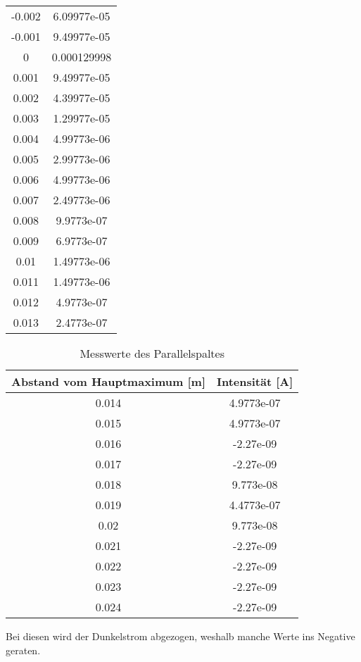 \begin{table}[H]
\begin{tabular}{c c}
 -0.002       &  6.09977e-05 \\
 -0.001       &  9.49977e-05 \\
  0           &  0.000129998 \\
  0.001       &  9.49977e-05 \\
  0.002       &  4.39977e-05 \\
  0.003       &  1.29977e-05 \\
  0.004       &  4.99773e-06 \\
  0.005       &  2.99773e-06 \\
  0.006       &  4.99773e-06 \\
  0.007       &  2.49773e-06 \\
  0.008       &  9.9773e-07  \\
  0.009       &  6.9773e-07  \\
  0.01        &  1.49773e-06 \\
  0.011       &  1.49773e-06 \\
  0.012       &  4.9773e-07  \\
  0.013       &  2.4773e-07  \\
  \bottomrule
  \end{tabular}
  \end{table}
  \begin{table}[H]
    \centering
    \caption{Messwerte des Parallelspaltes}
    \label{tab:mag}
    \begin{tabular}{c c}
     \toprule
      Abstand vom Hauptmaximum [m] & Intensität [A]\\
     \midrule
  0.014       &  4.9773e-07  \\
  0.015       &  4.9773e-07  \\
  0.016       & -2.27e-09    \\
  0.017       & -2.27e-09    \\
  0.018       &  9.773e-08   \\
  0.019       &  4.4773e-07  \\
  0.02        &  9.773e-08   \\
  0.021       & -2.27e-09    \\
  0.022       & -2.27e-09    \\
  0.023       & -2.27e-09    \\
  0.024       & -2.27e-09    \\
   \bottomrule
  \end{tabular}
 \end{table} 
  Bei diesen wird der Dunkelstrom abgezogen, weshalb manche Werte ins Negative geraten.
